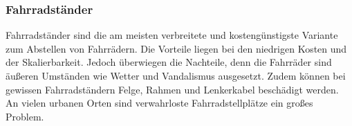 \subsubsection{Fahrradständer}
Fahrradständer sind die am meisten verbreitete und kostengünstigste Variante zum Abstellen von Fahrrädern. Die Vorteile liegen bei den niedrigen Kosten und der Skalierbarkeit. Jedoch überwiegen die Nachteile, denn die Fahrräder sind äußeren Umständen wie Wetter und Vandalismus ausgesetzt. Zudem können bei gewissen Fahrradständern Felge, Rahmen und Lenkerkabel beschädigt werden. An vielen urbanen Orten sind verwahrloste Fahrradstellplätze ein großes Problem.